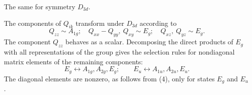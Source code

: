  The same for symmetry $D_{3d}$.

\SolutionHeading The components of $Q_{ik}$ transform under $D_{3d}$ according to
\[
 Q_{zz}\sim A_{1g};\quad Q_{xx}-Q_{yy},\ Q_{xy}\sim E_g;\quad Q_{xz},\ Q_{yz}\sim E_g.
\]
The component $Q_{zz}$ behaves as a scalar. Decomposing the direct products of $E_g$ with all representations of the group gives the selection rules for nondiagonal matrix elements of the remaining components:
\[
 E_g\leftrightarrow A_{1g},A_{2g},E_g;\qquad E_u\leftrightarrow A_{1u},A_{2u},E_u.
\]
The diagonal elements are nonzero, as follows from (4), only for states $E_g$ and $E_u$.

